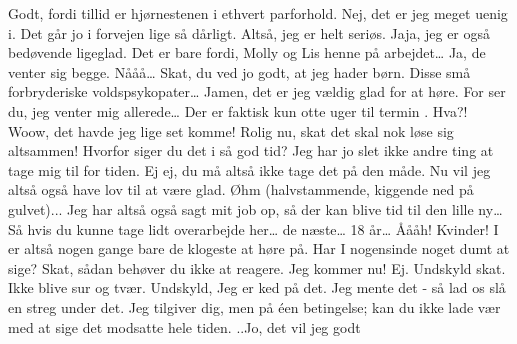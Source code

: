 \documentclass[a4paper,11pt]{article}
\begin{document}
\begin{sketch}
 Godt, fordi tillid er hjørnestenen i ethvert parforhold.
 Nej, det er jeg meget uenig i. Det går jo i forvejen lige så dårligt.
 Altså, jeg er helt seriøs.
 Jaja, jeg er også bedøvende ligeglad.
 Det er bare fordi, Molly og Lis henne på arbejdet… Ja, de venter sig begge.
 Nååå… Skat, du ved jo godt, at jeg hader børn. Disse små forbryderiske voldspsykopater…
 Jamen, det er jeg vældig glad for at høre. For ser du, jeg venter mig allerede… Der er faktisk kun otte uger til termin .
 Hva?! Woow, det havde jeg lige set komme!
 Rolig nu, skat det skal nok løse sig altsammen!
 Hvorfor siger du det i så god tid? Jeg har jo slet ikke andre ting at tage mig til for tiden.
 Ej ej, du må altså ikke tage det på den måde.
 Nu vil jeg altså også have lov til at være glad.
 Øhm (halvstammende, kiggende ned på gulvet)... Jeg har altså også sagt mit job op, så der kan blive tid til den lille ny… Så hvis du kunne tage lidt overarbejde her… de næste… 18 år…
 Åååh! Kvinder! I er altså nogen gange bare de klogeste at høre på. Har I nogensinde noget dumt at sige?
 Skat, sådan behøver du ikke at reagere.
 Jeg kommer nu!
 Ej. Undskyld skat. Ikke blive sur og tvær.
 Undskyld, Jeg er ked på det. Jeg mente det - så lad os slå en streg under det. 
 Jeg tilgiver dig, men på éen betingelse; kan du ikke lade vær med at sige det modsatte hele tiden.
 ..Jo, det vil jeg godt 
\end{sketch}
\end{document}
